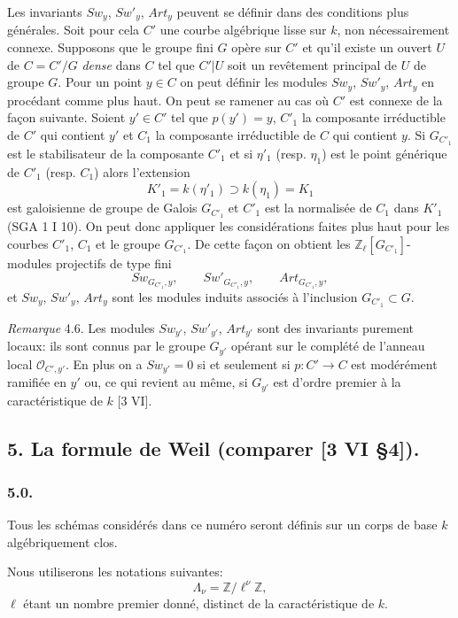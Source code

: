 \documentclass[11pt]{article}
\begin{document}
Les
invariants $Sw_y$, $Sw'_y$, $Art_y$ peuvent se définir dans des conditions plus générales. Soit pour cela $C'$ une courbe algébrique lisse sur $k$, non nécessairement connexe. Supposons que le groupe fini $G$ opère sur $C'$ et qu'il existe un ouvert $U$ de $C=C'/G$ \emph{dense} dans $C$ tel que $C'|U$ soit un revêtement principal de $U$ de groupe $G$. Pour un point $y\in C$ on peut définir les modules $Sw_y$, $Sw'_y$, $Art_y$ en procédant comme plus haut. On peut se ramener au cas où $C'$ est connexe de la façon suivante. Soient $y'\in C'$ tel que $p(y')=y$, $C'_1$ la composante irréductible de $C'$ qui contient $y'$ et $C_1$ la composante irréductible de $C$ qui contient $y$. Si $G_{C'_1}$ est le stabilisateur de la composante $C'_1$ et si $\eta'_1$ (resp. $\eta_1$) est le point générique de $C'_1$ (resp. $C_1$) alors l'extension
\[
K'_1=k(\eta'_1)\supset k(\eta_1)=K_1
\]
est galoisienne de groupe de Galois $G_{C'_1}$ et $C'_1$ est la normalisée de $C_1$ dans $K'_1$ (SGA 1 I 10). On peut donc appliquer les considérations faites plus haut pour les courbes $C'_1$, $C_1$ et le groupe $G_{C'_1}$. De cette façon on obtient les $\mathbb Z_\ell[G_{C'_1}]$-modules projectifs de type fini
\[
Sw_{G_{C'_1},y},\qquad Sw'_{G_{C'_1},y},\qquad Art_{G_{C'_1},y},
\]
et $Sw_y$, $Sw'_y$, $Art_y$ sont les modules induits associés à l'inclusion $G_{C'_1}\subset G$.

\emph{Remarque} 4.6. Les modules $Sw_{y'}$, $Sw'_{y'}$, $Art_{y'}$ sont des invariants purement locaux: ils sont connus par le groupe $G_{y'}$ opérant sur le complété de l'anneau local $\mathcal O_{C',y'}$. En plus on a $Sw_{y'}=0$ si et seulement si $p:C'\to C$ est modérément ramifiée en $y'$ ou, ce qui revient au même, si $G_{y'}$ est d'ordre premier à la caractéristique de $k$ [3 VI].

\subsection*{5. La formule de Weil (comparer [3 VI §4]).}

\subsubsection*{5.0.}

Tous les schémas considérés dans ce numéro seront définis sur un corps de base $k$ algébriquement clos.

Nous utiliserons les notations suivantes:
\[
\Lambda_\nu=\mathbb Z/\ell^\nu\mathbb Z,
\]
$\ell$ étant un nombre premier donné, distinct de la caractéristique de $k$.
\end{document}
